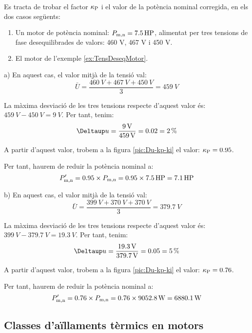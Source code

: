 \begin{exemple}[\MotorTensDeseqNEMA{}]
	\addcontentsxms{\MotorTensDeseqNEMA}
Es tracta de trobar el factor $\kappa_\mathrm{P}$  i el valor de la potència nominal corregida, en els dos casos següents:	
    \begin{enumerate}
		\renewcommand{\labelenumi}{\alph{enumi})}
		\item Un motor de  potència nominal: $P_\mathrm{m,n} = \qty{7,5}{HP}$, alimentat per tres tensions de fase desequilibrades   de valors: 460 V, 467 V i 450 V.
		
		\item El motor de l'exemple \vref{ex:TensDeseqMotor}.
	\end{enumerate}
	
	a)  En aquest cas, el valor mitjà de la tensió val:
    \[
      \bar{U} = \frac{\qty{460}{V}+\qty{467}{V}+\qty{450}{V}}{3} = \qty{459}{V}
    \]

    La màxima desviació de les tres tensions respecte d'aquest valor és: $\qty{459}{V}-\qty{450}{V} = \qty{9}{V}$. Per tant, tenim:
    \[
        \Deltaup u = \frac{\qty{9}{V}}{\qty{459}{V}} = \num{0,02} = \qty{2}{\%}
    \]

     A partir d'aquest valor, trobem a la figura \vref{pic:Du-kp-ki} el valor:  $\kappa_\mathrm{P} = \num{0,95}$.

     Per tant, haurem de reduir la potència nominal a:
     \[
         P'_\mathrm{m,n} = \num{0,95}\times{}P_\mathrm{m,n}  = \num{0,95}\times\qty{7,5}{HP} = \qty{7,1}{HP}
     \]
     
	 b)  En aquest cas, el valor mitjà de la tensió val:
	 \[
	 \bar{U} = \frac{\qty{399}{V}+\qty{370}{V}+\qty{370}{V}}{3} = \qty{379,7}{V}
	 \]
	 
	 La màxima desviació de les tres tensions respecte d'aquest valor és: $\qty{399}{V}-\qty{379,7}{V} = \qty{19,3}{V}$. Per tant, tenim:
	 \[
	 \Deltaup u = \frac{\qty{19,3}{V}}{\qty{379,7}{V}} = \num{0,05} = \qty{5}{\%}
	 \]
	 
	 A partir d'aquest valor, trobem a la figura \ref{pic:Du-kp-ki} el valor:  $\kappa_\mathrm{P} = \num{0,76}$.    
     
     Per tant, haurem de reduir la potència nominal a:
     \[
     P'_\mathrm{m,n} = \num{0,76}\times{}P_\mathrm{m,n}  = \num{0,76}\times\qty{9052,8}{W} = \qty{6880,1}{W}
     \]
\end{exemple}

\subsection{Classes d'aïllaments tèrmics en motors}


